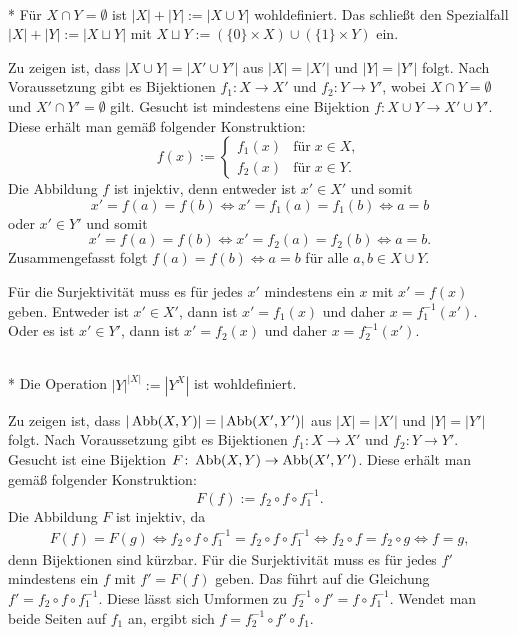 \begin{Definition}\mbox{}\\*
Für $X\cap Y=\emptyset$ ist $|X|+|Y|:=|X\cup Y|$ wohldefiniert.
Das schließt den Spezialfall $|X|+|Y|:=|X\sqcup Y|$ mit
$X\sqcup Y:=(\{0\}\times X)\cup(\{1\}\times Y)$ ein.
\end{Definition}
\begin{Beweis}
Zu zeigen ist, dass $|X\cup Y|=|X'\cup Y'|$
aus $|X|=|X'|$ und $|Y|=|Y'|$ folgt. Nach Voraussetzung gibt
es Bijektionen $f_1\colon X\to X'$ und $f_2\colon Y\to Y'$, wobei
$X\cap Y=\emptyset$ und $X'\cap Y'=\emptyset$ gilt. Gesucht
ist mindestens eine Bijektion $f\colon X\cup Y\to X'\cup Y'$.
Diese erhält man gemäß folgender Konstruktion:
\[f(x):=\begin{cases}
f_1(x)&\text{für}\;x\in X,\\
f_2(x)&\text{für}\;x\in Y.
\end{cases}\]
Die Abbildung $f$ ist injektiv, denn entweder ist $x'\in X'$
und somit
\[x'=f(a)=f(b)\iff x'=f_1(a)=f_1(b)\iff a=b\]
oder $x'\in Y'$ und somit
\[x'=f(a)=f(b)\iff x'=f_2(a)=f_2(b)\iff a=b.\]
Zusammengefasst folgt $f(a)=f(b)\iff a=b$ für alle $a,b\in X\cup Y$.

Für die Surjektivität muss es für jedes $x'$ mindestens ein $x$ mit
$x'=f(x)$ geben. Entweder ist $x'\in X'$, dann ist $x'=f_1(x)$
und daher $x=f_1^{-1}(x')$. Oder es ist $x'\in Y'$, dann ist
$x'=f_2(x)$ und daher $x=f_2^{-1}(x')$.\;\qedsymbol
\end{Beweis}

\newpage
\begin{Definition}\mbox{}\\*
Die Operation $|Y|^{|X|}:=|Y^X|$ ist wohldefiniert.
\end{Definition}
\begin{Beweis}
Zu zeigen ist, dass $|\operatorname{Abb}(X,Y)|=|\operatorname{Abb}(X',Y')|$
aus $|X|=|X'|$ und $|Y|=|Y'|$ folgt. Nach Voraussetzung gibt
es Bijektionen $f_1\colon X\to X'$ und $f_2\colon Y\to Y'$.
Gesucht ist eine Bijektion $F\colon\operatorname{Abb}(X,Y)\to\operatorname{Abb}(X',Y')$.
Diese erhält man gemäß folgender Konstruktion:
\[F(f) := f_2\circ f\circ f_1^{-1}.\]
Die Abbildung $F$ ist injektiv, da
\begin{gather*}
F(f)=F(g) \iff f_2\circ f\circ f_1^{-1} = f_2\circ f\circ f_1^{-1}
\iff f_2\circ f = f_2\circ g\iff f=g,
\end{gather*}
denn Bijektionen sind kürzbar. Für die Surjektivität muss
es für jedes $f'$ mindestens ein $f$ mit $f'=F(f)$ geben.
Das führt auf die Gleichung $f'=f_2\circ f\circ f_1^{-1}$.
Diese lässt sich Umformen zu $f_2^{-1}\circ f'=f\circ f_1^{-1}$.
Wendet man beide Seiten auf $f_1$ an, ergibt sich
$f=f_2^{-1}\circ f'\circ f_1$.\;\qedsymbol
\end{Beweis}

